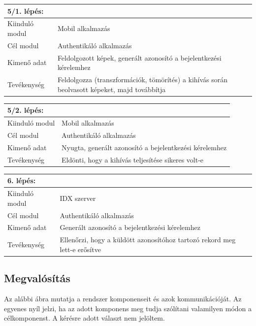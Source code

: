\begin{tabular}{|p{3cm}|p{10cm} |}
   	\hline
	\textbf{5/1. lépés:} & \textbf{}\\ \hline
	Kiinduló modul & Mobil alkalmazás \\ \hline
	Cél modul & Authentikáló alkalmazás \\ \hline
	Kimenő adat & Feldolgozott képek, generált azonosító a bejelentkezési kérelemhez \\ \hline
	Tevékenység & Feldolgozza (transzformációk, tömörítés) a kihívás során beolvasott képeket, majd továbbítja\\ \hline
\end{tabular}


\begin{tabular}{|p{3cm}|p{10cm} |}
   	\hline
	\textbf{5/2. lépés:} & \textbf{}\\ \hline
	Kiinduló modul & Mobil alkalmazás \\ \hline
	Cél modul & Authentikáló alkalmazás \\ \hline
	Kimenő adat & Nyugta, generált azonosító a bejelentkezési kérelemhez  \\ \hline
	Tevékenység & Eldönti, hogy a kihívás teljesítése sikeres volt-e\\ \hline
\end{tabular}

\begin{tabular}{|p{3cm}|p{10cm} |}
   	\hline
	\textbf{6. lépés:} & \textbf{}\\ \hline
	Kiinduló modul & IDX szerver \\ \hline
	Cél modul & Authentikáló alkalmazás \\ \hline
	Kimenő adat & Generált azonosító a bejelentkezési kérelemhez \\ \hline
	Tevékenység & Ellenőrzi, hogy a küldött azonosítóhoz tartozó rekord meg lett-e erősítve\\ \hline
\end{tabular}

\subsection{Megvalósítás}

Az alábbi ábra mutatja a rendszer komponenseit és azok kommunikációját. Az egyenes nyíl jelzi, ha az adott komponens meg tudja szólítani valamilyen módon a célkomponenst. A kérésre adott választ nem jelöltem.

